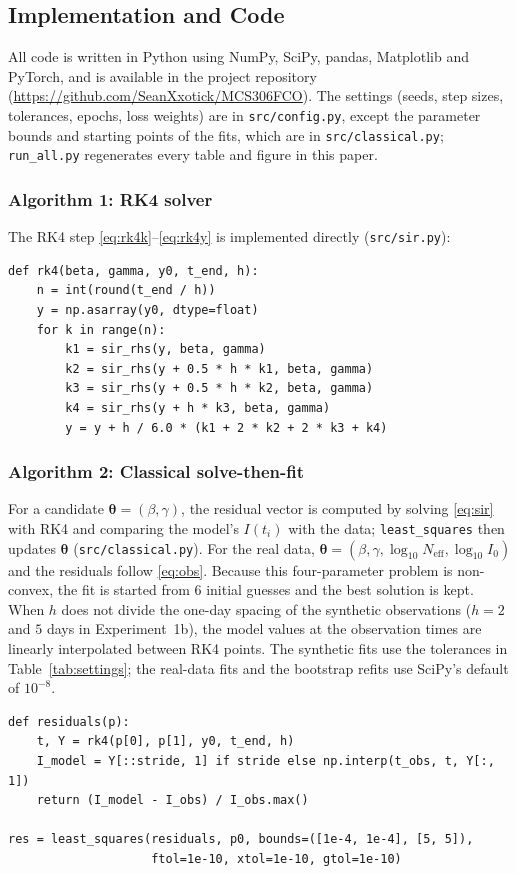\documentclass[12pt,a4paper]{article}
\newcommand{\Neff}{N_{\mathrm{eff}}}
\begin{document}
\subsection{Implementation and Code}

All code is written in Python using NumPy, SciPy, pandas, Matplotlib and PyTorch, and is available in the project repository (\url{https://github.com/SeanXxotick/MCS306FCO}). The settings (seeds, step sizes, tolerances, epochs, loss weights) are in \texttt{src/config.py}, except the parameter bounds and starting points of the fits, which are in \texttt{src/classical.py}; \texttt{run\_all.py} regenerates every table and figure in this paper.

\subsubsection*{Algorithm 1: RK4 solver}

The RK4 step \eqref{eq:rk4k}--\eqref{eq:rk4y} is implemented directly (\texttt{src/sir.py}):
\begin{lstlisting}
def rk4(beta, gamma, y0, t_end, h):
    n = int(round(t_end / h))
    y = np.asarray(y0, dtype=float)
    for k in range(n):
        k1 = sir_rhs(y, beta, gamma)
        k2 = sir_rhs(y + 0.5 * h * k1, beta, gamma)
        k3 = sir_rhs(y + 0.5 * h * k2, beta, gamma)
        k4 = sir_rhs(y + h * k3, beta, gamma)
        y = y + h / 6.0 * (k1 + 2 * k2 + 2 * k3 + k4)
\end{lstlisting}

\subsubsection*{Algorithm 2: Classical solve-then-fit}

For a candidate $\boldsymbol\theta=(\beta,\gamma)$, the residual vector is computed by solving \eqref{eq:sir} with RK4 and comparing the model's $I(t_i)$ with the data; \texttt{least\_squares} then updates $\boldsymbol\theta$ (\texttt{src/classical.py}). For the real data, $\boldsymbol\theta=(\beta,\gamma,\log_{10}\Neff,\log_{10}I_0)$ and the residuals follow \eqref{eq:obs}. Because this four-parameter problem is non-convex, the fit is started from 6 initial guesses and the best solution is kept. When $h$ does not divide the one-day spacing of the synthetic observations ($h=2$ and $5$ days in Experiment~1b), the model values at the observation times are linearly interpolated between RK4 points. The synthetic fits use the tolerances in Table~\ref{tab:settings}; the real-data fits and the bootstrap refits use SciPy's default of $10^{-8}$.
\begin{lstlisting}
def residuals(p):
    t, Y = rk4(p[0], p[1], y0, t_end, h)
    I_model = Y[::stride, 1] if stride else np.interp(t_obs, t, Y[:, 1])
    return (I_model - I_obs) / I_obs.max()

res = least_squares(residuals, p0, bounds=([1e-4, 1e-4], [5, 5]),
                    ftol=1e-10, xtol=1e-10, gtol=1e-10)
\end{lstlisting}
\end{document}
